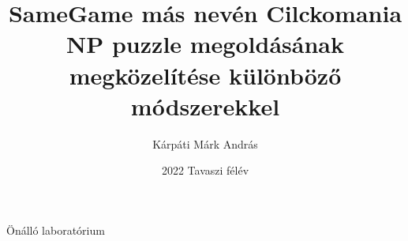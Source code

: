 \documentclass{article}
\title{SameGame más nevén Cilckomania NP puzzle megoldásának megközelítése különböző módszerekkel}
\author{Kárpáti Márk András}
\date{2022 Tavaszi félév}
\begin{document}
	
	\maketitle
	
	Önálló laboratórium
	
	
\end{document}
